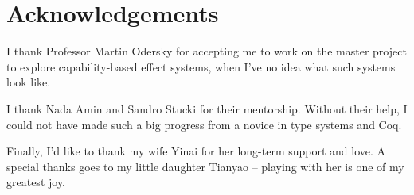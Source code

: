 \section*{\centering Acknowledgements}

I thank Professor Martin Odersky for accepting me to work on the
master project to explore capability-based effect systems, when I've
no idea what such systems look like.

I thank Nada Amin and Sandro Stucki for their mentorship. Without
their help, I could not have made such a big progress from a novice in
type systems and Coq.

Finally, I'd like to thank my wife Yinai for her long-term support and
love. A special thanks goes to my little daughter Tianyao -- playing
with her is one of my greatest joy.
